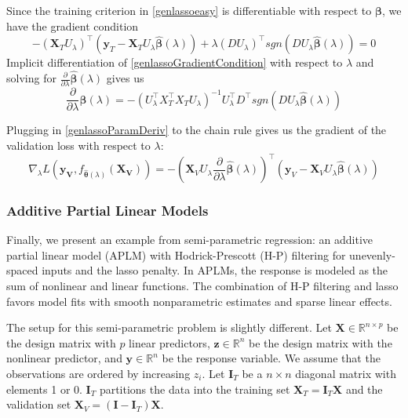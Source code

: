 \documentclass[10pt,letterpaper]{article}
\begin{document}
Since the training criterion in \eqref{genlassoeasy} is differentiable with respect to $\boldsymbol \beta$, we have the gradient condition
\begin{equation}
- (\boldsymbol{X}_T U_\lambda)^\top (\boldsymbol{y}_T - \boldsymbol{X}_T U_\lambda \hat {\boldsymbol\beta} (\lambda))
+ \lambda (D U_\lambda)^\top sgn(DU_\lambda \hat{\boldsymbol \beta}(\lambda)) = 0
\label{genlassoGradientCondition}
\end{equation}
Implicit differentiation of \eqref{genlassoGradientCondition} with respect to $\lambda$ and solving for $\frac{\partial}{\partial \lambda} \hat{\boldsymbol \beta}(\lambda)$ gives us
\begin{equation}
\frac{\partial}{\partial \lambda} \hat{\boldsymbol \beta}(\lambda) =
-(U_\lambda^\top X_T^\top X_T U_\lambda)^{-1} U_\lambda^\top D^\top sgn(DU_\lambda \hat{\boldsymbol \beta}(\lambda))
\label{genlassoParamDeriv}
\end{equation}

Plugging in \eqref{genlassoParamDeriv} to the chain rule gives us the gradient of the validation loss with respect to $\lambda$:
\begin{equation}
\nabla_{\lambda} L(\boldsymbol{y_V}, f_{\hat{\boldsymbol{\theta}}(\lambda)}(\boldsymbol{X_V})) = 
- \left (
\boldsymbol{X}_V U_\lambda
\frac{\partial}{\partial \lambda} \hat{\boldsymbol \beta}(\lambda)
\right )^\top
\left (
\boldsymbol{y}_V - \boldsymbol{X}_V U_\lambda \hat{\boldsymbol{\beta}} (\lambda)
\right )
\end{equation}

\subsubsection{Additive Partial Linear Models}

Finally, we present an example from semi-parametric regression: an additive partial linear model (APLM) with Hodrick-Prescott (H-P) filtering for unevenly-spaced inputs and the lasso penalty. In APLMs, the response is modeled as the sum of nonlinear and linear functions.  The combination of H-P filtering and lasso favors model fits with smooth nonparametric estimates and sparse linear effects.

The setup for this semi-parametric problem is slightly different. Let $\boldsymbol{X} \in \mathbb{R}^{n \times p}$ be the design matrix with $p$ linear predictors, $\boldsymbol{z} \in \mathbb{R}^n$ be the design matrix with the nonlinear predictor, and $\boldsymbol{y} \in \mathbb{R}^n$ be the response variable. We assume that the observations are ordered by increasing $z_i$. Let $\boldsymbol{I}_T$ be a $n \times n$ diagonal matrix with elements 1 or 0. $\boldsymbol{I}_T$ partitions the data into the training set $\boldsymbol{X}_T= \boldsymbol{I}_T \boldsymbol{X}$ and the validation set $\boldsymbol{X}_V= (\boldsymbol{I} - \boldsymbol{I}_T) \boldsymbol{X}$.
\end{document}

